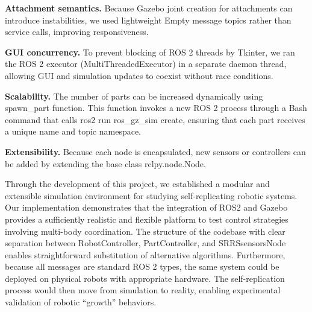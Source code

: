 \textbf{Attachment semantics.} Because Gazebo joint creation for attachments can 
introduce instabilities, we used lightweight Empty message topics rather 
than service calls, improving responsiveness.

\textbf{GUI concurrency.} To prevent blocking of ROS 2 threads by Tkinter, 
we ran the ROS 2 executor (MultiThreadedExecutor) in a separate daemon 
thread, allowing GUI and simulation updates to coexist without race conditions.

\textbf{ Scalability.} The number of parts can be increased dynamically using spawn\_part
 function. This function invokes a new ROS 2 process through a Bash command that 
calls ros2 run ros\_gz\_sim create, ensuring that each part receives a 
unique name and topic namespace.

\textbf{Extensibility.} Because each node is encapsulated, new sensors or controllers 
can be added by extending the base class rclpy.node.Node.


Through the development of this project, we established a modular and 
extensible simulation environment for studying self-replicating robotic 
systems. Our implementation demonstrates that the integration of ROS2
and Gazebo  provides a sufficiently realistic and flexible 
platform to test control strategies involving  multi-body coordination. 
The structure of the codebase with
clear separation between RobotController, PartController, and SRRSsensorsNode
enables straightforward substitution of alternative algorithms.
Furthermore, because all messages are standard ROS 2 types, the same 
system could be deployed on physical robots with appropriate hardware.
The self-replication process would then move from simulation to reality,
enabling experimental validation of robotic “growth” behaviors.



